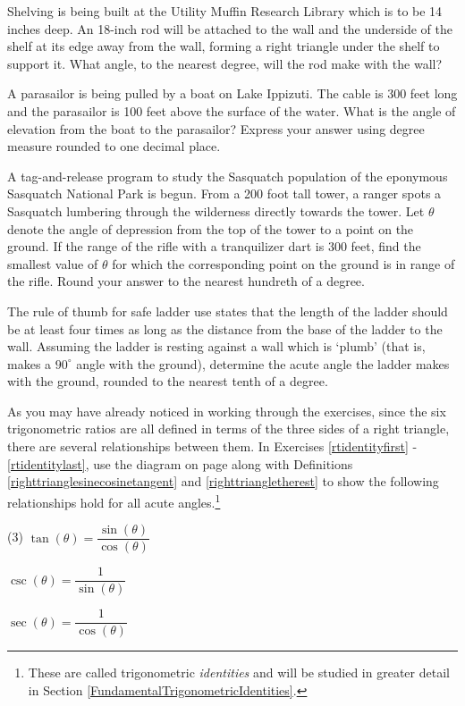 \begin{tasks}[resume]
\task Shelving is being built at the Utility Muffin Research Library which is to be 14 inches deep.  An 18-inch rod will be attached to the wall and the underside of the shelf at its edge away from the wall, forming a right triangle under the shelf to support it.  What angle, to the nearest degree, will the rod make with the wall?

\task A parasailor is being pulled by a boat on Lake Ippizuti.  The cable is 300 feet long and the parasailor is 100 feet above the surface of the water.  What is the angle of elevation from the boat to the parasailor?  Express your answer using degree measure rounded to one decimal place.

\task  A tag-and-release program to study the Sasquatch population of the eponymous Sasquatch National Park is begun.  From a 200 foot tall tower, a ranger spots a Sasquatch lumbering through the wilderness directly towards the tower.  Let $\theta$ denote the angle of depression from the top of the tower to a point on the ground.  If the range of the rifle with a tranquilizer dart is 300 feet, find the smallest value of $\theta$ for which the corresponding point on the ground is in range of the rifle.  Round your answer to the nearest hundreth of a degree.

\task  The rule of thumb for safe ladder use states that the length of the ladder should be at least four times as long as the distance from the base of the ladder to the wall. Assuming the ladder is resting against a wall which is `plumb' (that is, makes a $90^{\circ}$ angle with the ground), determine the acute angle the ladder makes with the ground, rounded to the nearest tenth of a degree.

\end{tasks}

As you may have already noticed in working through the exercises, since the six trigonometric ratios are all defined in terms of the three sides of a right triangle, there are several relationships between them.  In Exercises \ref{rtidentityfirst} - \ref{rtidentitylast}, use the diagram on page \pageref{righttranglediagram} along with Definitions \ref{righttrianglesinecosinetangent} and \ref{righttriangletherest} to show the following relationships hold for all acute angles.\footnote{These are called trigonometric \textit{identities} and will be studied in greater detail in Section \ref{FundamentalTrigonometricIdentities}.}

\begin{tasks}[resume](3)
\task  $\tan(\theta) = \dfrac{\sin(\theta)}{\cos(\theta)}$ \label{rtidentityfirst}

\task  $\csc(\theta) = \dfrac{1}{\sin(\theta)}$

\task  $\sec(\theta) = \dfrac{1}{\cos(\theta)}$

\end{tasks}

